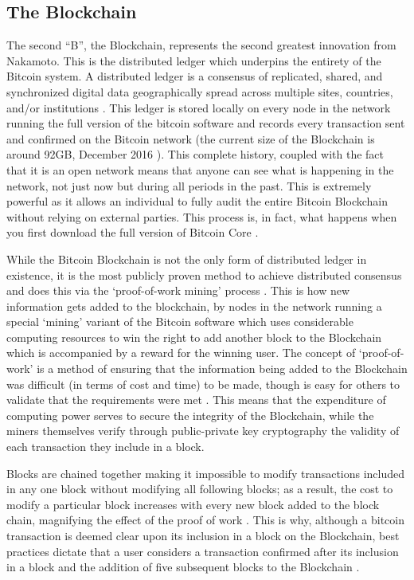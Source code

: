 \documentclass{article}
\begin{document}
\subsection{The Blockchain}

The second ``B'', the Blockchain, represents the second greatest innovation from Nakamoto. This is the distributed ledger which underpins the entirety of the Bitcoin system. A distributed ledger is a consensus of replicated, shared, and synchronized digital data geographically spread across multiple sites, countries, and/or institutions \citep{24_distributed_ledgers_and_blockchain_technology_2016}. This ledger is stored locally on every node in the network running the full version of the bitcoin software \citep{14_bitcoin_2009} and records every transaction sent and confirmed on the Bitcoin network (the current size of the Blockchain is around 92GB, December 2016 \citep{25_blockchain_size_2016}). This complete history, coupled with the fact that it is an open network means that anyone can see what is happening in the network, not just now but during all periods in the past. This is extremely powerful as it allows an individual to fully audit the entire Bitcoin Blockchain without relying on external parties. This process is, in fact, what happens when you first download the full version of Bitcoin Core \citep{20_developer_guide_bitcoin_2016}.

While the Bitcoin Blockchain is not the only form of distributed ledger in existence, it is the most publicly proven method to achieve distributed consensus and does this via the `proof-of-work mining' process \citep{24_distributed_ledgers_and_blockchain_technology_2016}. This is how new information gets added to the blockchain, by nodes in the network running a special `mining' variant of the Bitcoin software which uses considerable computing resources to win the right to add another block to the Blockchain which is accompanied by a reward for the winning user. The concept of `proof-of-work' is a method of ensuring that the information being added to the Blockchain was difficult (in terms of cost and time) to be made, though is easy for others to validate that the requirements were met \citep{26_blockchain_mining_-_distributed_ledgers_and_blockchain_technology_2016}. This means that the expenditure of computing power serves to secure the integrity of the Blockchain, while the miners themselves verify through public-private key cryptography the validity of each transaction they include in a block.

Blocks are chained together making it impossible to modify transactions included in any one block without modifying all following blocks; as a result, the cost to modify a particular block increases with every new block added to the block chain, magnifying the effect of the proof of work \citep{20_developer_guide_bitcoin_2016}\citep{38_proof_of_work_-_masterpage_2016}. This is why, although a bitcoin transaction is deemed clear upon its inclusion in a block on the Blockchain, best practices dictate that a user considers a transaction confirmed after its inclusion in a block and the addition of five subsequent blocks to the Blockchain \citep{27_confirmation_-_bitcoin_wiki_2016}.
\end{document}
